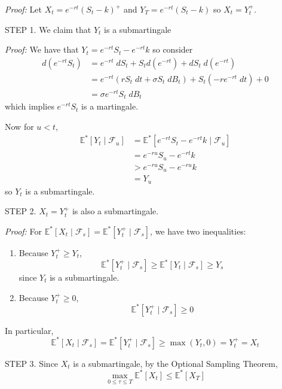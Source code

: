 \documentclass[12pt]{report}
\newcommand{\F}{\mathcal{F}}
\newcommand{\E}{\mathbb{E}}
\newenvironment*{tbox}[2][gray]{
    \begin{tcolorbox}[
        parbox=false,
        colback=#1!5!white,
        colframe=#1!75!black,
        breakable,
        title={#2}
    ]}
    {\end{tcolorbox}}
\newenvironment*{proof}[1][blue]{
\begin{tcolorbox}[
    parbox=false,
    colback=#1!5!white,
    colframe=#1!75!black,
    breakable
]}
{\end{tcolorbox}}
\begin{document}
    \begin{tbox}{\textbf{Claim:} The optimal stopping time $\tau^*$ for the maximization problem above is in fact $T$}
        \emph{Proof:} Let $X_t = e^{-rt}(S_t - k)^+$ and $Y_T = e^{-rt}(S_t - k)$ so $X_t = Y_t^+$. 

        STEP 1. We claim that $Y_t$ is a submartingale 

        \begin{proof}
            \emph{Proof:} We have that $Y_t = e^{-rt}S_t - e^{-rt}k$ so consider 
            \begin{align*}
                d(e^{-rt} S_t) &= e^{-rt} \; dS_t + S_t d(e^{-rt}) + dS_t \; d(e^{-rt})\\ 
                &= e^{-rt}(rS_t\; dt + \sigma S_t\; dB_t) + S_t(-re^{-rt}\; dt) +  0\\ 
                &= \sigma e^{-rt} S_t \; dB_t
            \end{align*}
            which implies $e^{-rt}S_t$ is a martingale. 
    
            Now for $u < t$, 
            \begin{align*}
                \E^*[Y_t \; | \; \F_u] &= \E^*[e^{-rt}S_t - e^{-rt}k \; | \; \F_u]\\ 
                    &= e^{-ru} S_u - e^{-rt}k\\ 
                    &> e^{-ru} S_u - e^{-ru}k\\ 
                    &= Y_u
            \end{align*}
            so $Y_t$ is a submartingale.
        \end{proof}

        STEP 2. $X_t = Y_t^+$ is also a submartingale.

        \begin{proof}
            \emph{Proof:} For $\E^*[X_t \; | \; \F_s] = \E^*[Y_t^+ \; | \; \F_s]$, we have two inequalities:
            \begin{enumerate}
                \item Because $Y_t^+ \geq Y_t$, 
                \[\E^*[Y_t^+ \; | \; \F_s] \geq \E^*[Y_t \; | \; \F_s] \geq Y_s\]
                since $Y_t$ is a submartingale.

                \item Because $Y_t^+ \geq 0$,
                \[\E^*[Y_t^+ \; | \; \F_s] \geq 0\]
            \end{enumerate}

            In particular, 
            \[\E^*[X_t \; | \; \F_s] = \E^*[Y_t^+ \; | \; \F_s] \geq \max(Y_t, 0) = Y_t^+ = X_t\]
        \end{proof}
        
        STEP 3. Since $X_t$ is a submartingale, by the Optional Sampling Theorem,
        \[\max_{0\leq \tau \leq T} \E^*[X_t] \leq \E^*[X_T]\]
    \end{tbox}
\end{document}

